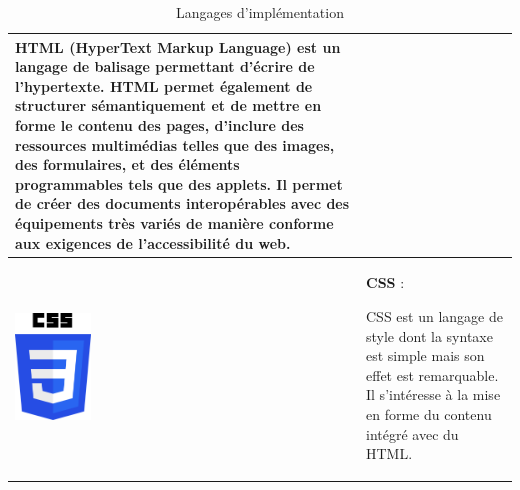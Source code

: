 \documentclass{article}
\begin{document}
\begin{table}[h!]
\begin{tabular}{|m{2cm}|m{12cm}|}
                            HTML (HyperText Markup Language) est un langage de balisage permettant d'écrire de l'hypertexte. HTML permet également de structurer sémantiquement et de mettre en forme le contenu des pages, d'inclure des ressources multimédias telles que des images, des formulaires, et des éléments programmables tels que des applets. Il permet de créer des documents interopérables avec des équipements très variés de manière conforme aux exigences de l'accessibilité du web. \\
                            \hline
                            \includegraphics[width=2cm]{assets/logos/css.png} &
                            \textbf{CSS} :
                            
                            CSS est un langage de style dont la syntaxe est simple mais son effet est remarquable. Il s'intéresse à la mise en forme du contenu intégré avec du HTML. \\
                            \hline
                        \end{tabular}
                        \caption{Langages d'implémentation}
                    \end{table}
                \FloatBarrier
\end{document}

